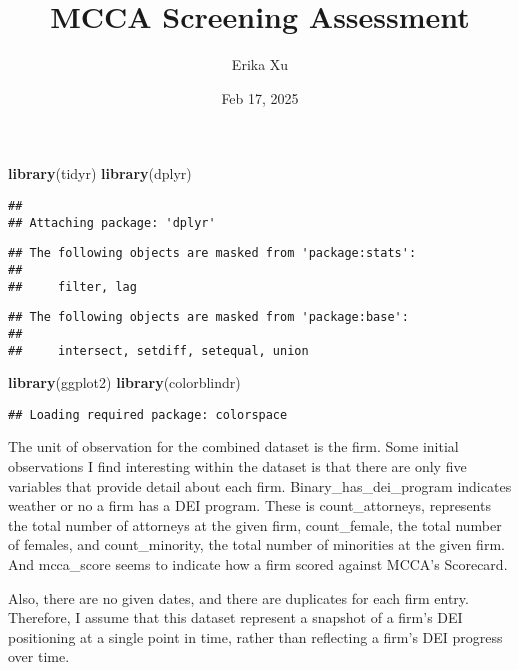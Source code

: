 \documentclass[
]{article}
\title{MCCA Screening Assessment}
\author{Erika Xu}
\date{Feb 17, 2025}
\newenvironment{Shaded}{\begin{snugshade}}{\end{snugshade}}
\newcommand{\FunctionTok}[1]{\textcolor[rgb]{0.13,0.29,0.53}{\textbf{#1}}}
\newcommand{\NormalTok}[1]{#1}
\begin{document}
\maketitle

\begin{Shaded}
\begin{Highlighting}[]
\FunctionTok{library}\NormalTok{(tidyr)}
\FunctionTok{library}\NormalTok{(dplyr)}
\end{Highlighting}
\end{Shaded}

\begin{verbatim}
## 
## Attaching package: 'dplyr'
\end{verbatim}

\begin{verbatim}
## The following objects are masked from 'package:stats':
## 
##     filter, lag
\end{verbatim}

\begin{verbatim}
## The following objects are masked from 'package:base':
## 
##     intersect, setdiff, setequal, union
\end{verbatim}

\begin{Shaded}
\begin{Highlighting}[]
\FunctionTok{library}\NormalTok{(ggplot2) }
\FunctionTok{library}\NormalTok{(colorblindr)}
\end{Highlighting}
\end{Shaded}

\begin{verbatim}
## Loading required package: colorspace
\end{verbatim}

The unit of observation for the combined dataset is the firm. Some
initial observations I find interesting within the dataset is that there
are only five variables that provide detail about each firm.
Binary\_has\_dei\_program indicates weather or no a firm has a DEI
program. These is count\_attorneys, represents the total number of
attorneys at the given firm, count\_female, the total number of females,
and count\_minority, the total number of minorities at the given firm.
And mcca\_score seems to indicate how a firm scored against MCCA's
Scorecard.

Also, there are no given dates, and there are duplicates for each firm
entry. Therefore, I assume that this dataset represent a snapshot of a
firm's DEI positioning at a single point in time, rather than reflecting
a firm's DEI progress over time.
\end{document}
